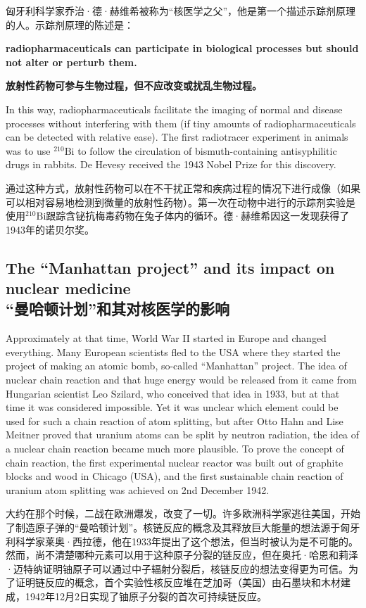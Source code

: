 \documentclass[dvipsnames, svgnames,a4paper,11pt]{article}
\begin{document}
匈牙利科学家乔治·德·赫维希被称为“核医学之父”，他是第一个描述示踪剂原理的人。示踪剂原理的陈述是：

\textbf{radiopharmaceuticals can participate in biological processes but should not alter or perturb them.}

\textbf{放射性药物可参与生物过程，但不应改变或扰乱生物过程。}

In this way, radiopharmaceuticals facilitate the imaging of normal and disease processes without interfering with them (if tiny amounts of radiopharmaceuticals can be detected with relative ease). The first radiotracer experiment in animals was to use ${}^\text{210}\text{Bi}$ to follow the circulation of bismuth-containing antisyphilitic drugs in rabbits. De Hevesy received the 1943 Nobel Prize for this discovery.

通过这种方式，放射性药物可以在不干扰正常和疾病过程的情况下进行成像（如果可以相对容易地检测到微量的放射性药物）。第一次在动物中进行的示踪剂实验是使用${}^\text{210}\text{Bi}$跟踪含铋抗梅毒药物在兔子体内的循环。德·赫维希因这一发现获得了1943年的诺贝尔奖。

\subsection{The “Manhattan project” and its impact on nuclear medicine\\“曼哈顿计划”和其对核医学的影响}

Approximately at that time, World War II started in Europe and changed everything. Many European scientists fled to the USA where they started the project of making an atomic bomb, so-called “Manhattan” project. The idea of nuclear chain reaction and that huge energy would be released from it came from Hungarian scientist Leo Szilard, who conceived that idea in 1933, but at that time it was considered impossible. Yet it was unclear which element could be used for such a chain reaction of atom splitting, but after Otto Hahn and Lise Meitner proved that uranium atoms can be split by neutron radiation, the idea of a nuclear chain reaction became much more plausible. To prove the concept of chain reaction, the first experimental nuclear reactor was built out of graphite blocks and wood in Chicago (USA), and the first sustainable chain reaction of uranium atom splitting was achieved on 2nd December 1942.

大约在那个时候，二战在欧洲爆发，改变了一切。许多欧洲科学家逃往美国，开始了制造原子弹的“曼哈顿计划”。核链反应的概念及其释放巨大能量的想法源于匈牙利科学家莱奥·西拉德，他在1933年提出了这个想法，但当时被认为是不可能的。然而，尚不清楚哪种元素可以用于这种原子分裂的链反应，但在奥托·哈恩和莉泽·迈特纳证明铀原子可以通过中子辐射分裂后，核链反应的想法变得更为可信。为了证明链反应的概念，首个实验性核反应堆在芝加哥（美国）由石墨块和木材建成，1942年12月2日实现了铀原子分裂的首次可持续链反应。
\end{document}
